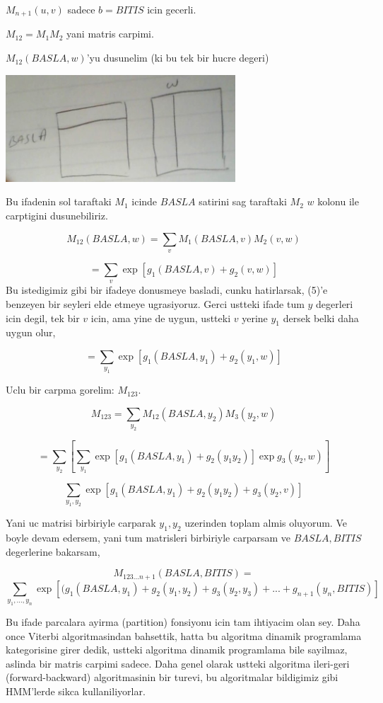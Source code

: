 \documentclass[12pt,fleqn]{article}\usepackage{../common}
\begin{document}
$M_{n+1}(u,v)$ sadece $b=BITIS$ icin gecerli. 

$M_{12} = M_1M_2$ yani matris carpimi. 

$M_{12}(BASLA,w)$'yu dusunelim (ki bu tek bir hucre degeri) 

\includegraphics[height=4cm]{crf_3.jpg}

Bu ifadenin sol taraftaki $M_1$ icinde $BASLA$ satirini sag taraftaki $M_2$
$w$ kolonu ile carptigini dusunebiliriz.

$$M_{12}(BASLA,w) = \sum_v M_1(BASLA, v)M_2(v,w)  $$

$$ = \sum_v \exp [g_1(BASLA,v) + g_2(v,w)] $$
Bu istedigimiz gibi bir ifadeye donusmeye basladi, cunku hatirlarsak, (5)'e
benzeyen bir seyleri elde etmeye ugrasiyoruz. Gerci ustteki ifade tum $y$
degerleri icin degil, tek bir $v$ icin, ama yine de uygun, ustteki $v$
yerine $y_1$ dersek belki daha uygun olur,

$$ = \sum_{y_1} \exp [g_1(BASLA,y_1) + g_2(y_1,w)] $$

Uclu bir carpma gorelim: $M_{123}$. 

$$ M_{123} = \sum_{y_2} M_{12}(BASLA, y_2)M_3(y_2,w)  $$

$$ = \sum_{y_2} [ \sum_{y_1}\exp [g_1(BASLA,y_1) + g_2(y_1y_2) ] 
\exp g_3(y_2,w) ]
$$

$$ \sum_{y_1,y_2} \exp [g_1(BASLA,y_1) + g_2(y_1y_2) + g_3(y_2,v)]  $$

Yani uc matrisi birbiriyle carparak $y_1,y_2$ uzerinden toplam almis
oluyorum. Ve boyle devam edersem, yani tum matrisleri birbiriyle carparsam
ve $BASLA, BITIS$ degerlerine bakarsam, 

$$ 
M_{123...n+1} (BASLA, BITIS) =  
$$
$$
\sum_{y_1,...,y_n}  \exp [
(g_1(BASLA,y_1) + g_2(y_1,y_2) + g_3(y_2,y_3) + ... + g_{n+1}  (y_n, BITIS)
]
$$

Bu ifade parcalara ayirma (partition) fonsiyonu icin tam ihtiyacim olan
sey. Daha once Viterbi algoritmasindan bahsettik, hatta bu algoritma
dinamik programlama kategorisine girer dedik, ustteki algoritma dinamik
programlama bile sayilmaz, aslinda bir matris carpimi sadece. Daha genel
olarak ustteki algoritma ileri-geri (forward-backward) algoritmasinin bir
turevi, bu algoritmalar bildigimiz gibi HMM'lerde sikca kullaniliyorlar.
\end{document}
